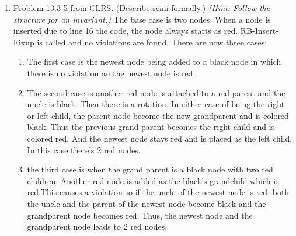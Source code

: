 \documentclass{article}
\begin{document}
\begin{enumerate}
\item Problem 13.3-5 from CLRS. (Describe semi-formally.) \emph{(Hint: Follow the structure for an invariant.)}
The base case is two nodes. When a node is inserted due to line 16 the code, the node always starts as red. RB-Insert-Fixup is called and no violations are found. There are now three cases:
\begin{enumerate}
\item The first case is the newest node being added to a black node in which there is no violation an the newest node is red.
\item The second case is another red node is attached to a red parent and the uncle is black. Then there is a rotation. In either case of being the right or left child, the parent node become the new grandparent and is colored black. Thus the previous grand parent becomes the right child and is colored red. And the newest node stays red and is placed as the left child. In this case there's 2 red nodes.
\item the third case is when the grand parent is a black node with two red children. Another red node is added as the black's grandchild which is red.This causes a violation so if the uncle of the newest node is red, both the uncle and the parent of the newest node become black and the grandparent node becomes red. Thus, the newest node and the grandparent node leads to 2 red nodes.
\end{enumerate}
\end{enumerate}
\end{document}
